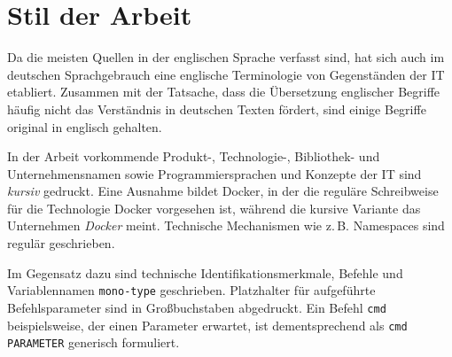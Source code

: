 \documentclass[../main.tex]{subfiles}
\begin{document}
  \section{Stil der Arbeit}
    Da die meisten Quellen in der englischen Sprache verfasst sind, hat sich auch im deutschen Sprachgebrauch eine englische Terminologie von Gegenständen der IT etabliert. Zusammen mit der Tatsache, dass die Übersetzung englischer Begriffe häufig nicht das Verständnis in deutschen Texten fördert, sind einige Begriffe original in englisch gehalten.

    In der Arbeit vorkommende Produkt-, Technologie-, Bibliothek- und Unternehmensnamen sowie Programmiersprachen und Konzepte der IT sind \emph{kursiv} gedruckt. Eine Ausnahme bildet Docker, in der die reguläre Schreibweise für die Technologie Docker vorgesehen ist, während die kursive Variante das Unternehmen \emph{Docker} meint. Technische Mechanismen wie z.\,B. Namespaces sind regulär geschrieben.

    Im Gegensatz dazu sind technische Identifikationsmerkmale, Befehle und Variablennamen \texttt{mono-type} geschrieben. Platzhalter für aufgeführte Befehlsparameter sind in Großbuchstaben abgedruckt. Ein Befehl \texttt{cmd} beispielsweise, der einen Parameter erwartet, ist dementsprechend als \texttt{cmd PARAMETER} generisch formuliert.
\end{document}
